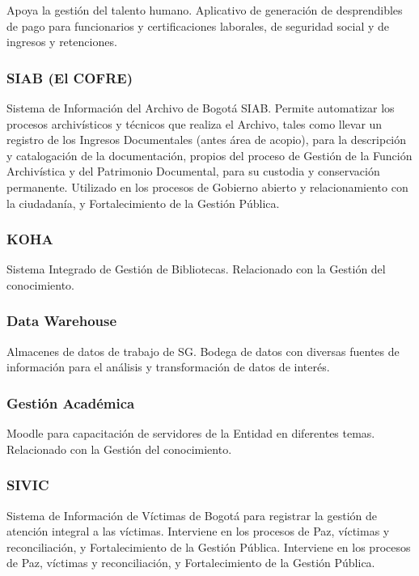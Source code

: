 \documentclass[
	a4paper, %
	12pt, %
]{include/CSSullivanBusinessReport}
\begin{document}
Apoya la gestión del talento humano. Aplicativo de generación de
desprendibles de pago para funcionarios y certificaciones laborales, de
seguridad social y de ingresos y retenciones.

\subsubsection{SIAB (El COFRE)}\label{sec:siab-el-cofre}

Sistema de Información del Archivo de Bogotá SIAB. Permite automatizar
los procesos archivísticos y técnicos que realiza el Archivo, tales como
llevar un registro de los Ingresos Documentales (antes área de acopio),
para la descripción y catalogación de la documentación, propios del
proceso de Gestión de la Función Archivística y del Patrimonio
Documental, para su custodia y conservación permanente. Utilizado en los
procesos de Gobierno abierto y relacionamiento con la ciudadanía, y
Fortalecimiento de la Gestión Pública.

\subsubsection{KOHA}\label{sec:koha}

Sistema Integrado de Gestión de Bibliotecas. Relacionado con la Gestión
del conocimiento.

\subsubsection{Data Warehouse}\label{sec:data-warehouse}

Almacenes de datos de trabajo de SG. Bodega de datos con diversas
fuentes de información para el análisis y transformación de datos de
interés.

\subsubsection{Gestión Académica}\label{sec:gestiuxf3n-acaduxe9mica}

Moodle para capacitación de servidores de la Entidad en diferentes
temas. Relacionado con la Gestión del conocimiento.

\subsubsection{SIVIC}\label{sec:sivic}

Sistema de Información de Víctimas de Bogotá para registrar la gestión
de atención integral a las víctimas. Interviene en los procesos de Paz,
víctimas y reconciliación, y Fortalecimiento de la Gestión Pública.
Interviene en los procesos de Paz, víctimas y reconciliación, y
Fortalecimiento de la Gestión Pública.
\end{document}
